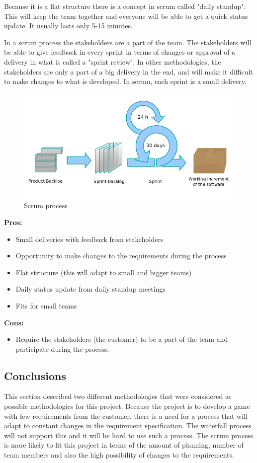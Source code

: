Because it is a flat structure there is a concept in scrum called "daily standup". This will keep the team together and everyone will be able to get a quick status update. It usually lasts only 5-15 minutes. 

In a scrum process the stakeholders are a part of the team. The stakeholders will be able to give
feedback in every sprint in terms of changes or approval of a delivery in what is called a "sprint review".
In other methodologies, the stakeholders are only a part of a big delivery in the end, and will 
make it difficult to make changes to what is developed. In scrum, each sprint is a small delivery.

\begin{figure}[!ht]
    \includegraphics[scale=0.4]{pictures/Scrumprocess.png}
    \caption{Scrum process}
\end{figure}

{\bf Pros: }
\begin{itemize}
	\item Small deliveries with feedback from stakeholders
	\item Opportunity to make changes to the requirements during the process
	\item Flat structure (this will adapt to small and bigger teams)
	\item Daily status update from daily standup meetings
	\item Fits for small teams
\end{itemize}

{\bf Cons: }
\begin{itemize}
	\item Require the stakeholders (the customer) to be a part of the team and participate during the process.
\end{itemize}

\subsection{Conclusions}
This section described two different methodologies that were considered as possible methodologies for this project. Because the project is to develop a game with few requirements from the customer, there is a need for a process that will adapt to constant changes in the requirement specification. The waterfall process will not support this and it will be hard to use such a process. The scrum process is more likely to fit this project in terms of the amount of planning, 
number of team members and also the high possibility of changes to the requirements.



